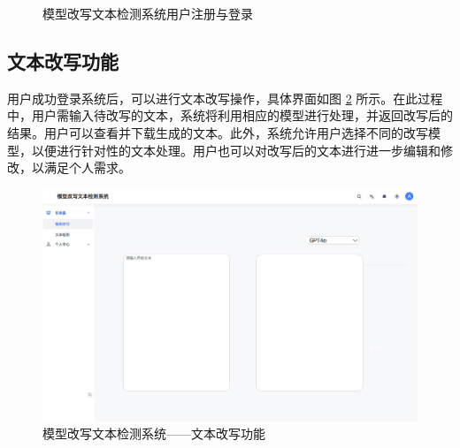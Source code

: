 \begin{figure}[htb]
    \hfill
    \caption{模型改写文本检测系统用户注册与登录}
    \label{fig:sys-login-register}
\end{figure}

\subsection{文本改写功能}

用户成功登录系统后，可以进行文本改写操作，具体界面如图 \ref{fig:sys-polish} 所示。在此过程中，用户需输入待改写的文本，系统将利用相应的模型进行处理，并返回改写后的结果。用户可以查看并下载生成的文本。此外，系统允许用户选择不同的改写模型，以便进行针对性的文本处理。用户也可以对改写后的文本进行进一步编辑和修改，以满足个人需求。

\begin{figure}[htb]
    \centering
    \includegraphics[width=\textwidth]{figures/sys-polish.jpg}
    \caption{模型改写文本检测系统——文本改写功能}
    \label{fig:sys-polish}
\end{figure}

